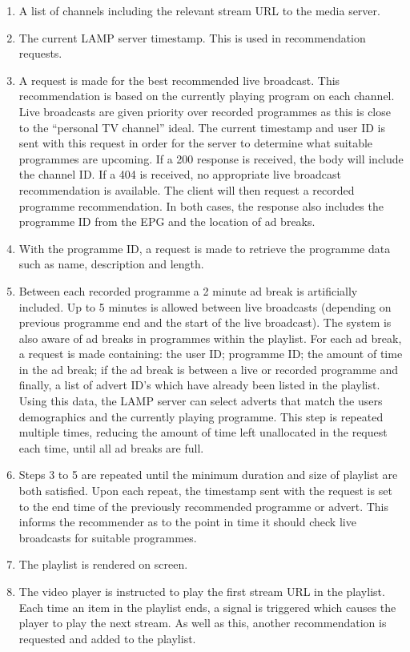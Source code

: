 \begin{enumerate}
	\item A list of channels including the relevant stream URL to the media server.
	\item The current LAMP server timestamp. This is used in recommendation requests.
	\item A request is made for the best recommended live broadcast. This recommendation is based on the currently playing program on each channel. Live broadcasts are given priority over recorded programmes as this is close to the ``personal TV channel'' ideal. The current timestamp and user ID is sent with this request in order for the server to determine what suitable programmes are upcoming. If a 200 response is received, the body will include the channel ID. If a 404 is received, no appropriate live broadcast recommendation is available. The client will then request a recorded programme recommendation. In both cases, the response also includes the programme ID from the EPG and the location of ad breaks.
	\item With the programme ID, a request is made to retrieve the programme data such as name, description and length.
	\item Between each recorded programme a 2 minute ad break is artificially included. Up to 5 minutes is allowed between live broadcasts (depending on previous programme end and the start of the live broadcast). The system is also aware of ad breaks in programmes within the playlist. For each ad break, a request is made containing: the user ID; programme ID; the amount of time in the ad break; if the ad break is between a live or recorded programme and finally, a list of advert ID's which have already been listed in the playlist. Using this data, the LAMP server can select adverts that match the users demographics and the currently playing programme. This step is repeated multiple times, reducing the amount of time left unallocated in the request each time, until all ad breaks are full.
	\item Steps 3 to 5 are repeated until the minimum duration and size of playlist are both satisfied. Upon each repeat, the timestamp sent with the request is set to the end time of the previously recommended programme or advert. This informs the recommender as to the point in time it should check live broadcasts for suitable programmes.
	\item The playlist is rendered on screen.
	\item The video player is instructed to play the first stream URL in the playlist. Each time an item in the playlist ends, a signal is triggered which causes the player to play the next stream. As well as this, another recommendation is requested and added to the playlist.
\end{enumerate}

